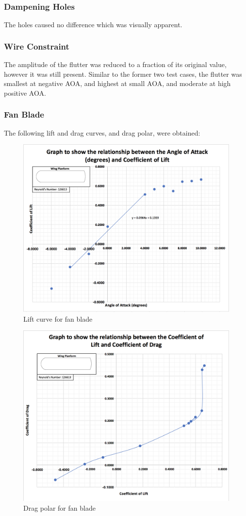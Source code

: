 \documentclass[12pt]{report} %
\begin{document}
\subsubsection{Dampening Holes}
The holes caused no difference which was visually apparent.

\subsubsection{Wire Constraint}
The amplitude of the flutter was reduced to a fraction of its original value, however it was still present.  Similar to the former two
test cases, the flutter was smallest at negative AOA, and highest at small AOA, and moderate at high positive AOA.

\subsubsection{Fan Blade}
The following lift and drag curves, and drag polar, were obtained:

\begin{figure}
	\includegraphics[width = 0.5\linewidth]{AOA_Cl.png}
	\caption{Lift curve for fan blade}
\end{figure}
\begin{figure}
	\includegraphics[width = 0.5\linewidth]{Cl_Cd.png}
	\caption{Drag polar for fan blade}
	\label{fan blade data}
\end{figure}
\end{document}
